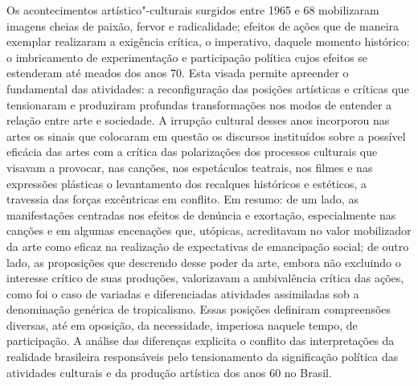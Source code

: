 Os acontecimentos artístico"-culturais surgidos entre 1965 e 68
mobilizaram imagens cheias de paixão, fervor e radicalidade; efeitos de
ações que de maneira exemplar realizaram a exigência crítica, o
imperativo, daquele momento histórico: o imbricamento de experimentação
e participação política cujos efeitos se estenderam até meados dos anos
70. Esta visada permite apreender o fundamental das atividades: a
reconfiguração das posições artísticas e críticas que tensionaram e
produziram profundas transformações nos modos de entender a relação
entre arte e sociedade. A irrupção cultural desses anos incorporou nas
artes os sinais que colocaram em questão os discursos instituídos sobre
a possível eficácia das artes com a crítica das polarizações dos
processos culturais que visavam a provocar, nas canções, nos espetáculos
teatrais, nos filmes e nas expressões plásticas o levantamento dos
recalques históricos e estéticos, a travessia das forças excêntricas em
conflito. Em resumo: de um lado, as manifestações centradas nos efeitos
de denúncia e exortação, especialmente nas canções e em algumas
encenações que, utópicas, acreditavam no valor mobilizador da arte como
eficaz na realização de expectativas de emancipação social; de outro
lado, as proposições que descrendo desse poder da arte, embora não
excluindo o interesse crítico de suas produções, valorizavam a
ambivalência crítica das ações, como foi o caso de variadas e
diferenciadas atividades assimiladas sob a denominação genérica de
tropicalismo. Essas posições definiram compreensões diversas, até em
oposição, da necessidade, imperiosa naquele tempo, de participação. A
análise das diferenças explicita o conflito das interpretações da
realidade brasileira responsáveis pelo tensionamento da significação
política das atividades culturais e da produção artística dos anos 60 no
Brasil.

